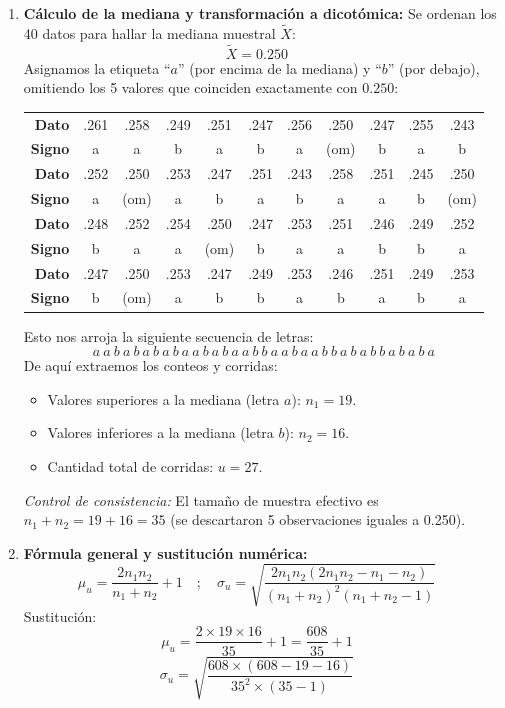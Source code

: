 \documentclass[11pt,a4paper]{article}
\begin{document}
\begin{enumerate}
    \item \textbf{Cálculo de la mediana y transformación a dicotómica:}
    Se ordenan los 40 datos para hallar la mediana muestral $\tilde{X}$:
    \[ \tilde{X} = 0.250 \quad \]
    Asignamos la etiqueta ``$a$'' (por encima de la mediana) y ``$b$'' (por debajo), omitiendo los 5 valores que coinciden exactamente con $0.250$:
    \begin{center}
    \small
    \begin{tabular}{r cccccccccc}
        \toprule
        \textbf{Dato} & .261 & .258 & .249 & .251 & .247 & .256 & .250 & .247 & .255 & .243 \\
        \textbf{Signo} & a & a & b & a & b & a & (om) & b & a & b \\
        \midrule
        \textbf{Dato} & .252 & .250 & .253 & .247 & .251 & .243 & .258 & .251 & .245 & .250 \\
        \textbf{Signo} & a & (om) & a & b & a & b & a & a & b & (om) \\
        \midrule
        \textbf{Dato} & .248 & .252 & .254 & .250 & .247 & .253 & .251 & .246 & .249 & .252 \\
        \textbf{Signo} & b & a & a & (om) & b & a & a & b & b & a \\
        \midrule
        \textbf{Dato} & .247 & .250 & .253 & .247 & .249 & .253 & .246 & .251 & .249 & .253 \\
        \textbf{Signo} & b & (om) & a & b & b & a & b & a & b & a \\
        \bottomrule
    \end{tabular}
    \end{center}

    Esto nos arroja la siguiente secuencia de letras:
    \[ a\ a\ b\ a\ b\ a\ b\ a\ b\ a\ a\ b\ a\ b\ a\ a\ b\ b\ a\ a\ b\ a\ a\ b\ b\ a\ b\ a\ b\ b\ a\ b\ a\ b\ a \]
    De aquí extraemos los conteos y corridas:
    \begin{itemize}
        \item Valores superiores a la mediana (letra $a$): $n_1 = 19$.
        \item Valores inferiores a la mediana (letra $b$): $n_2 = 16$.
        \item Cantidad total de corridas: $u = 27$.
    \end{itemize}
    \textit{Control de consistencia:} El tamaño de muestra efectivo es $n_1 + n_2 = 19 + 16 = 35$ (se descartaron 5 observaciones iguales a 0.250).

    \item \textbf{Fórmula general y sustitución numérica:}
    \[ \mu_u = \frac{2 n_1 n_2}{n_1 + n_2} + 1 \quad ; \quad \sigma_u = \sqrt{\frac{2 n_1 n_2 (2 n_1 n_2 - n_1 - n_2)}{(n_1 + n_2)^2 (n_1 + n_2 - 1)}} \quad \]
    Sustitución:
    \[ \mu_u = \frac{2 \times 19 \times 16}{35} + 1 = \frac{608}{35} + 1 \quad \]
    \[ \sigma_u = \sqrt{\frac{608 \times (608 - 19 - 16)}{35^2 \times (35 - 1)}} \quad \]


\end{enumerate}
\end{document}
